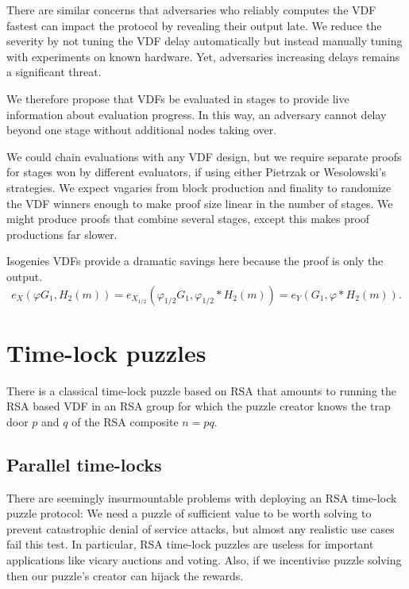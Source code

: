 \documentclass{article}
\newcommand\mathperiod{.}
\begin{document}
There are similar concerns that adversaries who reliably computes the VDF fastest can impact the protocol by revealing their output late.  We reduce the severity by not tuning the VDF delay automatically but instead manually tuning with experiments on known hardware.  Yet, adversaries increasing delays remains a significant threat.

We therefore propose that VDFs be evaluated in stages to provide live information about evaluation progress.  In this way, an adversary cannot delay beyond one stage without additional nodes taking over.  

We could chain evaluations with any VDF design, but we require separate proofs for stages won by different evaluators, if using either Pietrzak or Wesolowski's strategies.  We expect vagaries from block production and finality to randomize the VDF winners enough to make proof size linear in the number of stages.  We might produce proofs that combine several stages, except this makes proof productions far slower.

Isogenies VDFs provide a dramatic savings here because the proof is only the output.
$$ e_X( φ G_1, H_2(m) ) = e_{X_{1/2}}( φ_{1/2} G_1, φ_{1/2}* H_2(m) ) = e_Y( G_1, φ* H_2(m) ) \mathperiod $$


\section{Time-lock puzzles}


There is a classical time-lock puzzle based on RSA \cite{TLP} that
amounts to running the RSA based VDF in an RSA group for which the
puzzle creator knows the trap door $p$ and $q$ of the RSA composite
$n = p q$.  

\subsection{Parallel time-locks}

There are seemingly insurmountable problems with deploying an RSA
time-lock puzzle protocol:
We need a puzzle of sufficient value to be worth solving to prevent
catastrophic denial of service attacks, but almost any realistic use
cases fail this test.  In particular, RSA time-lock puzzles are
useless for important applications like vicary auctions and voting. 
Also, if we incentivise puzzle solving then our puzzle's creator can
hijack the rewards.  
\end{document}
